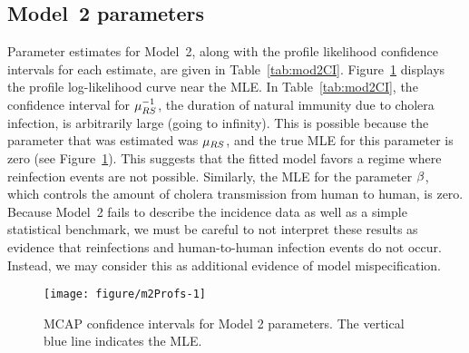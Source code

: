 \subsection{Model~2 parameters}

Parameter estimates for Model~2, along with the profile likelihood confidence intervals for each estimate, are given in Table~\ref{tab:mod2CI}.
Figure~\ref{fig:m2Profs} displays the profile log-likelihood curve near the MLE.
In Table~\ref{tab:mod2CI}, the confidence interval for $\mu_{RS}^{-1}$, the duration of natural immunity due to cholera infection, is arbitrarily large (going to infinity).
This is possible because the parameter that was estimated was $\mu_{RS}$, and the true MLE for this parameter is zero (see Figure~\ref{fig:m2Profs}).
This suggests that the fitted model favors a regime where reinfection events are not possible.
Similarly, the MLE for the parameter $\beta$, which controls the amount of cholera transmission from human to human, is zero.
Because Model~2 fails to describe the incidence data as well as a simple statistical benchmark, we must be careful to not interpret these results as evidence that reinfections and human-to-human infection events do not occur.
Instead, we may consider this as additional evidence of model mispecification.



\begin{figure}[ht]
\begin{knitrout}
\color{fgcolor}
\texttt{[image: figure/m2Profs-1]} 
\end{knitrout}
\caption[MCAP confidence intervals for Model 2 parameters.]{\label{fig:m2Profs}MCAP confidence intervals for Model 2 parameters. The vertical blue line indicates the MLE.}
\end{figure}

